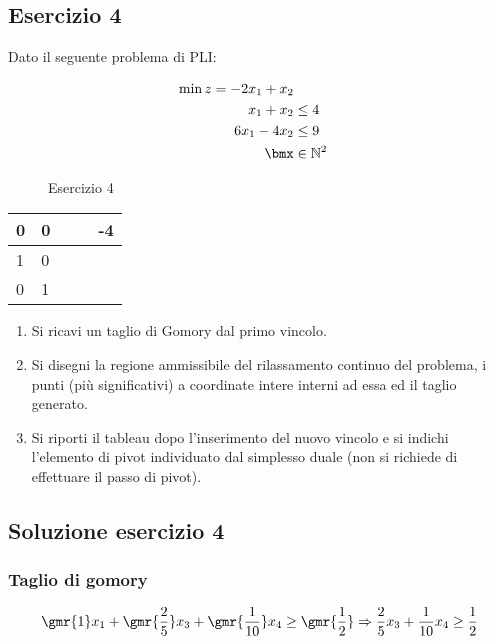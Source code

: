 \documentclass[\main/main.tex]{subfiles}
\begin{document}
\subsection{Esercizio 4}
Dato il seguente problema di PLI:

\begin{figure}
  \begin{align*}
    \min z =-2x_1+ x_2             \\
    x_1 + x_2   & \leq 4           \\
    6x_1 - 4x_2 & \leq 9           \\
    \bmx        & \in \mathbb{N}^2
  \end{align*}
  \caption{Esercizio 4}
\end{figure}

\begin{table}
  \begin{tabular}{LLLL|L}
    0 & 0 &  &   & -4           \\
     & 0 &  &   &  \\
    0 & 1 &  &  & 
  \end{tabular}
\end{table}

\begin{enumerate}
  \item Si ricavi un taglio di Gomory dal primo vincolo.
  \item Si disegni la regione ammissibile del rilassamento continuo del problema, i punti (più significativi) a coordinate intere interni ad essa ed il taglio generato.
  \item Si riporti il tableau dopo l'inserimento del nuovo vincolo e si indichi l'elemento di pivot individuato dal simplesso duale (non si richiede di effettuare il passo di pivot).
\end{enumerate}

\subsection{Soluzione esercizio 4}
\subsubsection*{Taglio di gomory}
\[
  \gmr{1}x_1+\gmr{\frac{2}{5}}x_3 + \gmr{\frac{1}{10}}x_4 \geq \gmr{\frac{1}{2}}
  \Rightarrow
  \frac{2}{5}x_3 + \frac{1}{10}x_4 \geq \frac{1}{2}
\]
\end{document}
